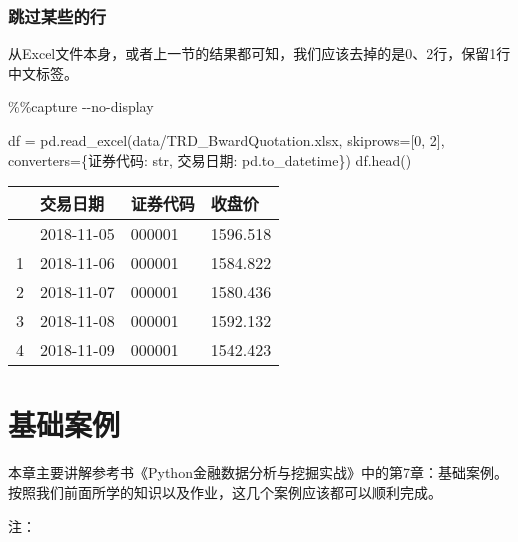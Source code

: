 \documentclass[
  letterpaper,
  DIV=11,
  numbers=noendperiod]{scrreprt}
\newenvironment{Shaded}{\begin{snugshade}}{\end{snugshade}}
\newcommand{\BuiltInTok}[1]{\textcolor[rgb]{0.00,0.23,0.31}{#1}}
\newcommand{\DecValTok}[1]{\textcolor[rgb]{0.68,0.00,0.00}{#1}}
\newcommand{\NormalTok}[1]{\textcolor[rgb]{0.00,0.23,0.31}{#1}}
\newcommand{\OperatorTok}[1]{\textcolor[rgb]{0.37,0.37,0.37}{#1}}
\newcommand{\StringTok}[1]{\textcolor[rgb]{0.13,0.47,0.30}{#1}}
\begin{document}
\hypertarget{ux8df3ux8fc7ux67d0ux4e9bux7684ux884c}{%
\subsection{跳过某些的行}\label{ux8df3ux8fc7ux67d0ux4e9bux7684ux884c}}

从Excel文件本身，或者上一节的结果都可知，我们应该去掉的是0、2行，保留1行中文标签。

\begin{Shaded}
\begin{Highlighting}[]
\OperatorTok{\%\%}\NormalTok{capture }\OperatorTok{{-}{-}}\NormalTok{no}\OperatorTok{{-}}\NormalTok{display}

\NormalTok{df }\OperatorTok{=}\NormalTok{ pd.read\_excel(}\StringTok{\textquotesingle{}data/TRD\_BwardQuotation.xlsx\textquotesingle{}}\NormalTok{, skiprows}\OperatorTok{=}\NormalTok{[}\DecValTok{0}\NormalTok{, }\DecValTok{2}\NormalTok{],}
\NormalTok{                   converters}\OperatorTok{=}\NormalTok{\{}\StringTok{\textquotesingle{}证券代码\textquotesingle{}}\NormalTok{: }\BuiltInTok{str}\NormalTok{, }\StringTok{\textquotesingle{}交易日期\textquotesingle{}}\NormalTok{: pd.to\_datetime\})}
\NormalTok{df.head()}
\end{Highlighting}
\end{Shaded}

\begin{longtable}[]{@{}llll@{}}
\toprule\noalign{}
& 交易日期 & 证券代码 & 收盘价 \\
\midrule\noalign{}
\endhead
\bottomrule\noalign{}
\endlastfoot
0 & 2018-11-05 & 000001 & 1596.518 \\
1 & 2018-11-06 & 000001 & 1584.822 \\
2 & 2018-11-07 & 000001 & 1580.436 \\
3 & 2018-11-08 & 000001 & 1592.132 \\
4 & 2018-11-09 & 000001 & 1542.423 \\
\end{longtable}

\hypertarget{ux57faux7840ux6848ux4f8b}{%
\chapter{基础案例}\label{ux57faux7840ux6848ux4f8b}}

本章主要讲解参考书《Python金融数据分析与挖掘实战》中的第7章：基础案例。按照我们前面所学的知识以及作业，这几个案例应该都可以顺利完成。

注：
\end{document}
